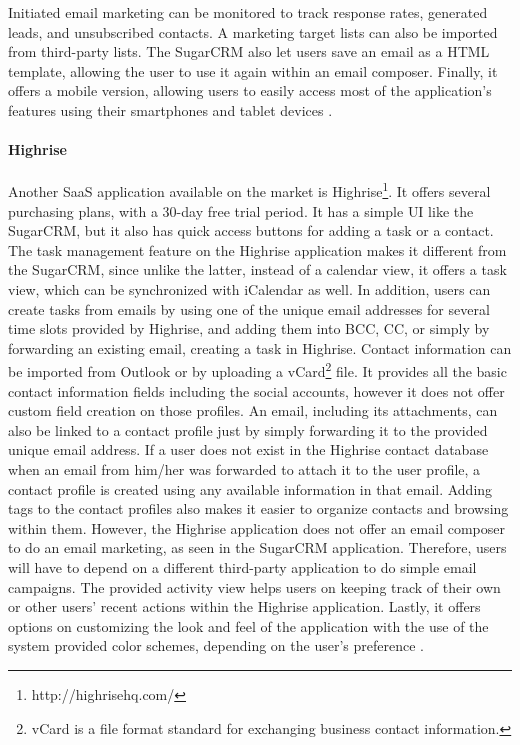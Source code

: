 Initiated email marketing can be monitored to track response rates, generated leads, and unsubscribed contacts. A marketing target lists can also be imported from third-party lists. The SugarCRM also let users save an email as a \ac{HTML} template, allowing the user to use it again within an email composer. Finally, it offers a mobile version, allowing users to easily access most of the application's features using their smartphones and tablet devices \citep{SugarCRMInc.2013}.

\paragraph{Highrise}
Another \ac{SaaS} application available on the market is Highrise\footnote{http://highrisehq.com/}. It offers several purchasing plans, with a 30-day free trial period. It has a simple \ac{UI} like the SugarCRM, but it also has quick access buttons for adding a task or a contact. The task management feature on the Highrise application makes it different from the SugarCRM, since unlike the latter, instead of a calendar view, it offers a task view, which can be synchronized with iCalendar as well. In addition, users can create tasks from emails by using one of the unique email addresses for several time slots provided by Highrise, and adding them into \ac{BCC}, \ac{CC}, or simply by forwarding an existing email, creating a task in Highrise. Contact information can be imported from Outlook or by uploading a vCard\footnote{vCard is a file format standard for exchanging business contact information.} file. It provides all the basic contact information fields including the social accounts, however it does not offer custom field creation on those profiles. An email, including its attachments, can also be linked to a contact profile just by simply forwarding it to the provided unique email address. If a user does not exist in the Highrise contact database when an email from him/her was forwarded to attach it to the user profile, a contact profile is created using any available information in that email. Adding tags to the contact profiles also makes it easier to organize contacts and browsing within them. However, the Highrise application does not offer an email composer to do an email marketing, as seen in the SugarCRM application. Therefore, users will have to depend on a different third-party application to do simple email campaigns. The provided activity view helps users on keeping track of their own or other users' recent actions within the Highrise application. Lastly, it offers options on customizing the look and feel of the application with the use of the system provided color schemes, depending on the user's preference \citep{37signals2013}.


